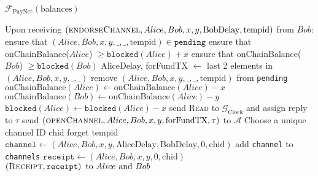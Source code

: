 \begin{functionality}{$\mathcal{F}_{\mathrm{PayNet}}
\left(\mathrm{balances}\right)$}
\begin{algorithmic}[1]
    \State Upon receiving $\left(\textsc{endorseChannel}, Alice, Bob, x, y,
    \mathrm{BobDelay}, \mathrm{tempid}\right)$ from $Bob$: 
    \Indent
      \State ensure that $\left(Alice, Bob, x, y, \_, \_, \mathrm{tempid}\right)
      \in \mathtt{pending}$
      \State ensure that onChainBalance($Alice$) $\geq
      \mathtt{blocked}\left(Alice\right) + x$
      \State ensure that onChainBalance($Bob$) $\geq
      \mathtt{blocked}\left(Bob\right)$
      \State AliceDelay, forFundTX $\gets$ last 2 elements in $\left(Alice,
      Bob, x, y, \_, \_\right)$
      \State remove $\left(Alice, Bob, x, y, \_, \_, \mathrm{tempid}\right)$
      from \texttt{pending}
      \State $\mathrm{onChainBalance}\left(Alice\right) \gets
      \mathrm{onChainBalance}\left(Alice\right) - x$
      \State $\mathrm{onChainBalance}\left(Bob\right) \gets
      \mathrm{onChainBalance}\left(Alice\right) - y$
      \State $\mathtt{blocked}\left(Alice\right) \gets
      \mathtt{blocked}\left(Alice\right) - x$
      \State send \textsc{Read} to $\mathcal{G}_{\mathrm{Clock}}$ and assign
      reply to $\tau$
      \State send $\left(\textsc{openChannel}, Alice, Bob, x, y,
      \mathrm{forFundTX}, \tau\right)$ to $\mathcal{A}$ 
      \State Choose a unique channel ID chid
      \State forget tempid
      \State $\mathtt{channel} \gets \left(Alice, Bob, x, y,
      \mathrm{AliceDelay}, \mathrm{BobDelay}, 0, \mathrm{chid}\right)$
      \State add \texttt{channel} to \texttt{channels}
      \State $\mathtt{receipt} \gets \left(Alice, Bob, x, y, 0,
      \mathrm{chid}\right)$
      \State \Return $\left(\textsc{Receipt}, \mathtt{receipt}\right) \text{
      to } Alice \text{ and } Bob$
    \EndIndent
    \State {}
    \State {}


\end{algorithmic}
\end{functionality}
